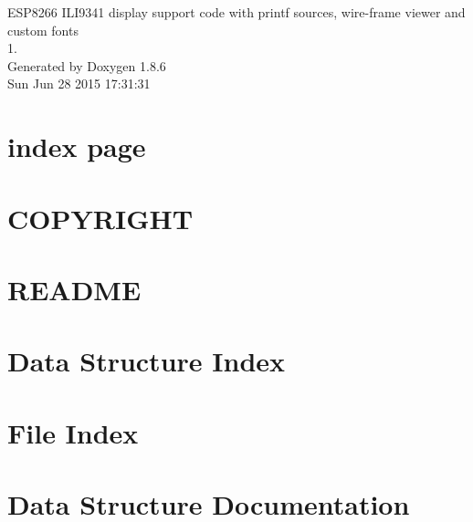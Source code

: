 \documentclass[twoside]{book}
\newcommand{\clearemptydoublepage}{%
  \newpage{\pagestyle{empty}\cleardoublepage}%
}
\begin{document}
\hypersetup{pageanchor=false}
\begin{titlepage}
\vspace*{7cm}
\begin{center}%
{\Large E\-S\-P8266 I\-L\-I9341 display support code with printf sources, wire-\/frame viewer and custom fonts \\[1ex]\large 1. }\\
\vspace*{1cm}
{\large Generated by Doxygen 1.8.6}\\
\vspace*{0.5cm}
{\small Sun Jun 28 2015 17:31:31}\\
\end{center}
\end{titlepage}
\clearemptydoublepage
\tableofcontents
\clearemptydoublepage
{}
\hypersetup{pageanchor=true}

\chapter{index page}
\label{index}\hypertarget{index}{}
\chapter{C\-O\-P\-Y\-R\-I\-G\-H\-T}
\label{md_COPYRIGHT}
\hypertarget{md_COPYRIGHT}{}

\chapter{R\-E\-A\-D\-M\-E}
\label{md_README}
\hypertarget{md_README}{}

\chapter{Data Structure Index}

\chapter{File Index}

\chapter{Data Structure Documentation}














\end{document}
